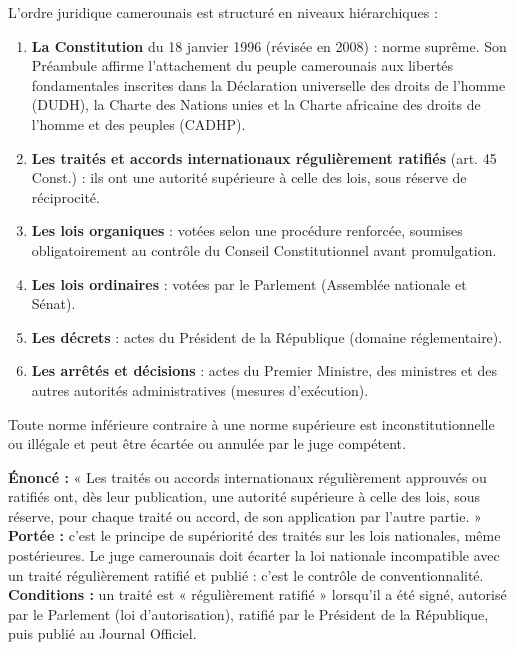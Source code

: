 \documentclass[11pt]{article}
\newcommand{\cle}[1]{{\popxbold\color{popdark}#1}}
\begin{document}
\begin{definition}
L'ordre juridique camerounais est structuré en niveaux hiérarchiques :
\begin{enumerate}
    \item \textbf{La Constitution} du 18 janvier 1996 (révisée en 2008) : norme suprême. Son Préambule affirme l'attachement du peuple camerounais aux libertés fondamentales inscrites dans la Déclaration universelle des droits de l'homme (DUDH), la Charte des Nations unies et la Charte africaine des droits de l'homme et des peuples (CADHP).
    \item \textbf{Les traités et accords internationaux régulièrement ratifiés} (art. 45 Const.) : ils ont une autorité supérieure à celle des lois, sous réserve de réciprocité.
    \item \textbf{Les lois organiques} : votées selon une procédure renforcée, soumises obligatoirement au contrôle du Conseil Constitutionnel avant promulgation.
    \item \textbf{Les lois ordinaires} : votées par le Parlement (Assemblée nationale et Sénat).
    \item \textbf{Les décrets} : actes du Président de la République (domaine réglementaire).
    \item \textbf{Les arrêtés et décisions} : actes du Premier Ministre, des ministres et des autres autorités administratives (mesures d'exécution).
\end{enumerate}
Toute norme inférieure contraire à une norme supérieure est inconstitutionnelle ou illégale et peut être écartée ou annulée par le juge compétent.
\end{definition}

\begin{propriete}
\textbf{Énoncé :} « Les traités ou accords internationaux régulièrement approuvés ou ratifiés ont, dès leur publication, une autorité supérieure à celle des lois, sous réserve, pour chaque traité ou accord, de son application par l'autre partie. »
\textbf{Portée :} c'est le principe de \cle{supériorité des traités sur les lois nationales}, même postérieures. Le juge camerounais doit écarter la loi nationale incompatible avec un traité régulièrement ratifié et publié : c'est le \cle{contrôle de conventionnalité}.
\textbf{Conditions :} un traité est « régulièrement ratifié » lorsqu'il a été signé, autorisé par le Parlement (loi d'autorisation), ratifié par le Président de la République, puis publié au Journal Officiel.
\end{propriete}
\end{document}
